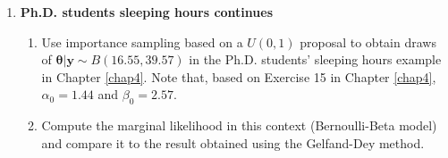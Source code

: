 \begin{enumerate}
 \item \textbf{Ph.D. students sleeping hours continues}
\begin{enumerate}
	\item Use importance sampling based on a $U(0,1)$ proposal to obtain draws of $\bm{\theta}|\bm{y} \sim B(16.55,39.57)$ in the Ph.D. students' sleeping hours example in Chapter \ref{chap4}. Note that, based on Exercise 15 in Chapter \ref{chap4}, $\alpha_0 = 1.44$ and $\beta_0 = 2.57$.
	\item Compute the marginal likelihood in this context (Bernoulli-Beta model) and compare it to the result obtained using the Gelfand-Dey method.
\end{enumerate}
    
	
\end{enumerate}



